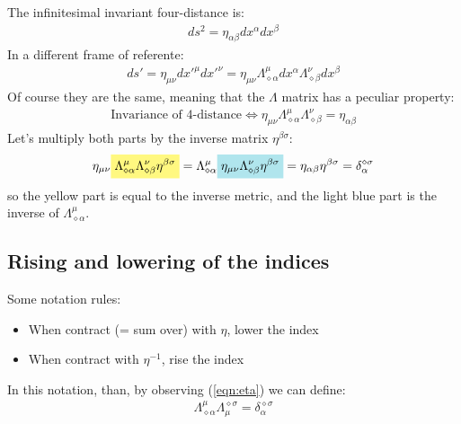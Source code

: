 \documentclass[../template.tex]{subfiles}
\begin{document}
The infinitesimal invariant four-distance is:
\begin{align*}
ds^2 = \eta_{\alpha\beta} dx^\alpha dx^\beta
\end{align*}
In a different frame of referente:
\begin{align*}
ds' = \eta_{\mu\nu} dx'^\mu dx'^\nu = \eta_{\mu\nu}\Lambda^\mu_{\diamond \alpha}dx^\alpha \Lambda^\nu_{\diamond \beta}dx^\beta
\end{align*}
Of course they are the same, meaning that the $\Lambda$ matrix has a peculiar property:
\begin{align*}
\text{Invariance of $4$-distance} \Leftrightarrow \eta_{\mu\nu} \Lambda^\mu_{\diamond\alpha}\Lambda^\nu_{\diamond \beta} = \eta_{\alpha\beta}
\end{align*}
Let's multiply both parts by the inverse matrix $\eta^{\beta\sigma}$:
\begin{align}
\eta_{\mu\nu} \hlc{Yellow}{\Lambda^\mu_{\diamond\alpha} \Lambda^\nu_{\diamond\beta} \eta^{\beta\sigma}} = \Lambda^\mu_{\diamond \alpha}\hlc{SkyBlue}{\eta_{\mu\nu} \Lambda^\nu_{\diamond\beta}\eta^{\beta\sigma}} =  \eta_{\alpha\beta}\eta^{\beta\sigma} = \delta_\alpha^{\diamond\sigma}
\label{eqn:eta}
\end{align}
so the yellow part is equal to the inverse metric, and the light blue part is the inverse of $\Lambda^\mu_{\diamond\alpha}$.

\subsection{Rising and lowering of the indices}
Some notation rules:
\begin{itemize}
\item When contract (= sum over) with $\eta$, lower the index
\item When contract with $\eta^{-1}$, rise the index
\end{itemize}
In this notation, than, by observing (\ref{eqn:eta}) we can define:
\begin{align*}
\Lambda^\mu_{\diamond\alpha} \Lambda^{\diamond\sigma}_\mu = \delta^{\diamond\sigma}_\alpha
\end{align*}
\end{document}
